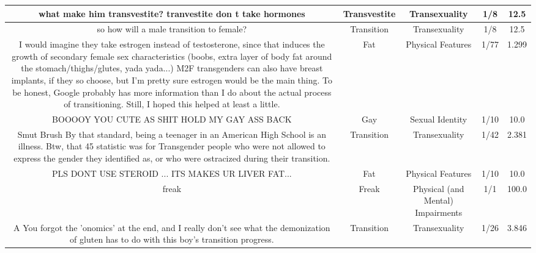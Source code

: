 \documentclass[11pt]{article}
\newlength\mylength
\begin{document}
\begin{center}
\begin{longtable}{|C{.40\mylength}|C{.30\mylength}|C{.15\mylength}|C{.15\mylength}|C{.15\mylength}|}
  what make him transvestite? tranvestite don t take hormones  & Transvestite & Transexuality & 1/8 & 12.5 \\  \hline
  so how will a male transition to female?  & Transition & Transexuality & 1/8 & 12.5 \\  \hline
  I would imagine they take estrogen instead of testosterone, since that induces the growth of secondary female sex characteristics (boobs, extra layer of body fat around the stomach/thighs/glutes, yada yada...) M2F transgenders can also have breast implants, if they so choose, but I'm pretty sure estrogen would be the main thing.   To be honest, Google probably has more information than I do about the actual process of transitioning. Still, I hoped this helped at least a little.  & Fat & Physical Features & 1/77 & 1.299 \\  \hline
  BOOOOY YOU CUTE AS SHIT HOLD MY GAY ASS BACK  & Gay & Sexual Identity & 1/10 & 10.0 \\  \hline
  Smut Brush By that standard, being a teenager in an American High School is an illness.   Btw, that 45  statistic was for Transgender people who were not allowed to express the gender they identified as, or who were ostracized during their transition.  & Transition & Transexuality & 1/42 & 2.381 \\  \hline
  PLS DONT USE STEROID ... ITS MAKES UR LIVER FAT...  & Fat & Physical Features & 1/10 & 10.0 \\  \hline
  freak  & Freak & Physical (and Mental) Impairments & 1/1 & 100.0 \\  \hline
  A You forgot the 'onomics' at the end, and I really don't see what the demonization of gluten has to do with this boy's transition progress.  & Transition & Transexuality & 1/26 & 3.846 \\  \hline

\end{longtable}
\end{center}
\end{document}
